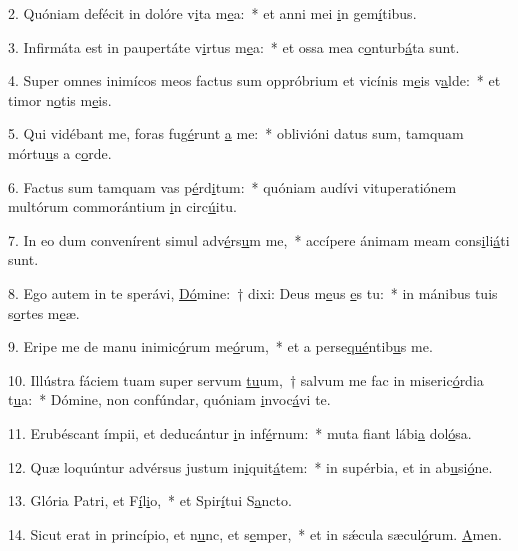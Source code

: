 2. Quóniam defécit in dolóre v\uline{i}ta m\uline{e}a:~* et anni mei \uline{i}n gem\uline{í}tibus.\par 
3. Infirmáta est in paupertáte v\uline{i}rtus m\uline{e}a:~* et ossa mea c\uline{o}nturb\uline{á}ta sunt.\par 
4. Super omnes inimícos meos factus sum oppróbrium et vicínis m\uline{e}is v\uline{a}lde:~* et timor n\uline{o}tis m\uline{e}is.\par 
5. Qui vidébant me, foras fug\uline{é}runt \uline{a} me:~* oblivióni datus sum, tamquam mórtu\uline{u}s a c\uline{o}rde.\par 
6. Factus sum tamquam vas p\uline{é}rd\uline{i}tum:~* quóniam audívi vituperatiónem multórum commorántium \uline{i}n circ\uline{ú}itu.\par 
7. In eo dum convenírent simul adv\uline{é}rs\uline{u}m me,~* accípere ánimam meam cons\uline{i}li\uline{á}ti sunt.\par 
8. Ego autem in te sperávi, \uline{Dó}mine:~† dixi: Deus m\uline{e}us \uline{e}s tu:~* in mánibus tuis s\uline{o}rtes m\uline{e}æ.\par 
9. Eripe me de manu inimic\uline{ó}rum me\uline{ó}rum,~* et a perse\uline{qué}ntib\uline{u}s me.\par 
10. Illústra fáciem tuam super servum \uline{tu}um,~† salvum me fac in miseric\uline{ó}rdia t\uline{u}a:~* Dómine, non confúndar, quóniam \uline{i}nvoc\uline{á}vi te.\par 
11. Erubéscant ímpii, et deducántur \uline{i}n inf\uline{é}rnum:~* muta fiant lábi\uline{a} dol\uline{ó}sa.\par 
12. Quæ loquúntur advérsus justum in\uline{i}quit\uline{á}tem:~* in supérbia, et in ab\uline{u}si\uline{ó}ne.\par 
13. Glória Patri, et F\uline{í}l\uline{i}o,~* et Spir\uline{í}tui S\uline{a}ncto.\par 
14. Sicut erat in princípio, et n\uline{u}nc, et s\uline{e}mper,~* et in sǽcula sæcul\uline{ó}rum. \uline{A}men.\par 
